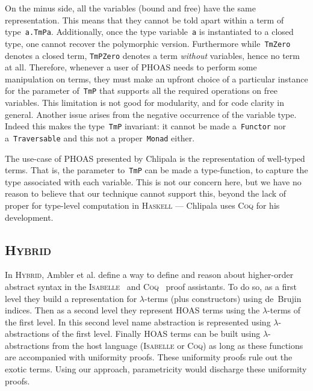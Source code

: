 \documentclass[9pt,authoryear]{sigplanconf}
\begin{document}
{{}\vphantom{$\{$}}%


%
On the minus side, all the variables (bound and free) have the
    same representation. This means that they cannot be told apart
    within a term of type{~}\texttt{\makebox[1.22ex][c]{$ \forall $}}\texttt{\mbox{\hspace{0.50em}}}\texttt{a}\texttt{.}\texttt{\mbox{\hspace{0.50em}}}\texttt{TmP}\texttt{\mbox{\hspace{0.50em}}}\texttt{a}. Additionally, once the type
    variable{~}\texttt{a} is instantiated to a closed type, one cannot recover
    the polymorphic version. Furthermore while{~}\texttt{Tm}\texttt{\mbox{\hspace{0.50em}}}\texttt{Zero} denotes a
    closed term, \texttt{TmP}\texttt{\mbox{\hspace{0.50em}}}\texttt{Zero} denotes a term \emph{without} variables,
    hence no term at all. Therefore, whenever a user of PHOAS needs to
    perform some manipulation on terms, they must make an upfront choice
    of a particular instance for the parameter of{~}\texttt{TmP} that supports
    all the required operations on free variables. This limitation is
    not good for modularity, and for code clarity in general. Another
    issue arises from the negative occurrence of the variable type.
    Indeed this makes the type{~}\texttt{TmP} invariant{:} it cannot be made
    a{~}\texttt{Functor} nor a{~}\texttt{Traversable} and this not a proper{~}\texttt{Monad}    either.%


%
The use-case of PHOAS presented by Chlipala is the representation
    of well-typed terms. That is, the parameter to{~}\texttt{TmP} can be made
    a type-function, to capture the type associated with each variable.
    This is not our concern here, but we have no reason to believe that
    our technique cannot support this, beyond the lack of proper for
    type-level computation in \textsc{Haskell} --- Chlipala uses \textsc{Coq} for
    his development.%


\subsection{\textsc{Hybrid}}

%
In \textsc{Hybrid}, Ambler et al. define a way to define and reason about
    higher-order abstract syntax in the \textsc{Isabelle}{~}\cite{ambler-02} and
    \textsc{Coq}{~}\cite{capretta-06} proof assistants. To do so, as a first
    level they build a representation for $ \lambda $-terms (plus constructors)
    using de{~}Brujin indices. Then as a second level they represent HOAS
    terms using the $ \lambda $-terms of the first level. In this second level
    name abstraction is represented using $ \lambda $-abstractions of the first
    level. Finally HOAS terms can be built using $ \lambda $-abstractions from the
    host language (\textsc{Isabelle} or \textsc{Coq}) as long as these functions are
    accompanied with uniformity proofs. These uniformity proofs rule out
    the exotic terms. Using our approach, parametricity would discharge
    these uniformity proofs.%
\end{document}
